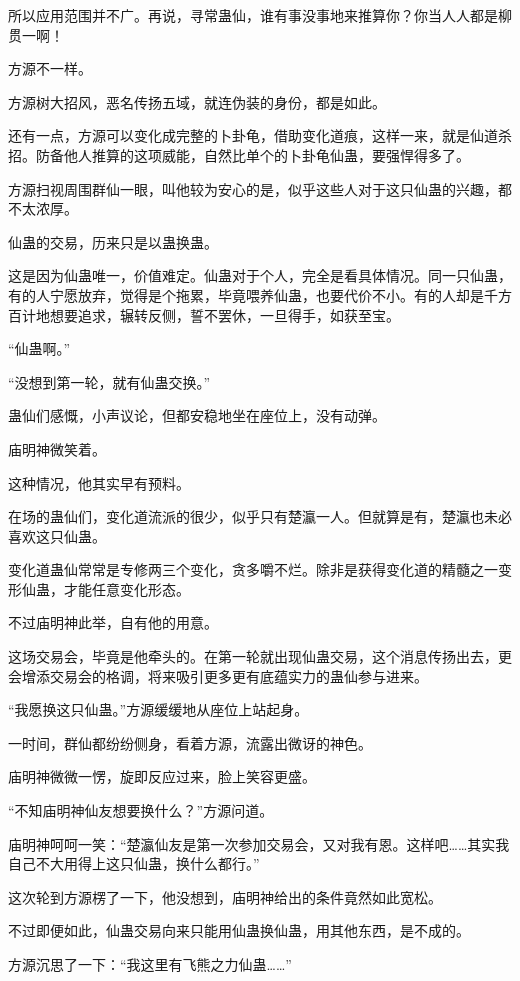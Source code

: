 \begin{this_body}
所以应用范围并不广。再说，寻常蛊仙，谁有事没事地来推算你？你当人人都是柳贯一啊！

方源不一样。

方源树大招风，恶名传扬五域，就连伪装的身份，都是如此。

还有一点，方源可以变化成完整的卜卦龟，借助变化道痕，这样一来，就是仙道杀招。防备他人推算的这项威能，自然比单个的卜卦龟仙蛊，要强悍得多了。

方源扫视周围群仙一眼，叫他较为安心的是，似乎这些人对于这只仙蛊的兴趣，都不太浓厚。

仙蛊的交易，历来只是以蛊换蛊。

这是因为仙蛊唯一，价值难定。仙蛊对于个人，完全是看具体情况。同一只仙蛊，有的人宁愿放弃，觉得是个拖累，毕竟喂养仙蛊，也要代价不小。有的人却是千方百计地想要追求，辗转反侧，誓不罢休，一旦得手，如获至宝。

“仙蛊啊。”

“没想到第一轮，就有仙蛊交换。”

蛊仙们感慨，小声议论，但都安稳地坐在座位上，没有动弹。

庙明神微笑着。

这种情况，他其实早有预料。

在场的蛊仙们，变化道流派的很少，似乎只有楚瀛一人。但就算是有，楚瀛也未必喜欢这只仙蛊。

变化道蛊仙常常是专修两三个变化，贪多嚼不烂。除非是获得变化道的精髓之一变形仙蛊，才能任意变化形态。

不过庙明神此举，自有他的用意。

这场交易会，毕竟是他牵头的。在第一轮就出现仙蛊交易，这个消息传扬出去，更会增添交易会的格调，将来吸引更多更有底蕴实力的蛊仙参与进来。

“我愿换这只仙蛊。”方源缓缓地从座位上站起身。

一时间，群仙都纷纷侧身，看着方源，流露出微讶的神色。

庙明神微微一愣，旋即反应过来，脸上笑容更盛。

“不知庙明神仙友想要换什么？”方源问道。

庙明神呵呵一笑：“楚瀛仙友是第一次参加交易会，又对我有恩。这样吧……其实我自己不大用得上这只仙蛊，换什么都行。”

这次轮到方源楞了一下，他没想到，庙明神给出的条件竟然如此宽松。

不过即便如此，仙蛊交易向来只能用仙蛊换仙蛊，用其他东西，是不成的。

方源沉思了一下：“我这里有飞熊之力仙蛊……”


\end{this_body}
